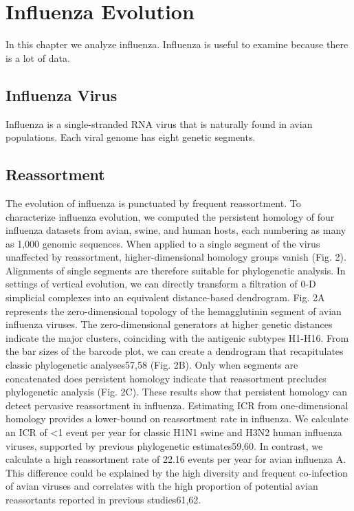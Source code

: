\chapter{Influenza Evolution}
\label{ch:influenza}

In this chapter we analyze influenza.
Influenza is useful to examine because there is a lot of data.

\section{Influenza Virus}
\label{sec:flu_introduction}

Influenza is a single-stranded RNA virus that is naturally found in avian populations.
Each viral genome has eight genetic segments.

\section{Reassortment}
\label{sec:flu_reassortment}

The evolution of influenza is punctuated by frequent reassortment.
To characterize influenza evolution, we computed the persistent homology of four influenza datasets from avian, swine, and human hosts, each numbering as many as 1,000 genomic sequences.
When applied to a single segment of the virus unaffected by reassortment, higher-dimensional homology groups vanish (Fig. 2).
Alignments of single segments are therefore suitable for phylogenetic analysis.
In settings of vertical evolution, we can directly transform a filtration of 0-D simplicial complexes into an equivalent distance-based dendrogram.
 Fig. 2A represents the zero-dimensional topology of the hemagglutinin segment of avian influenza viruses. 
 The zero-dimensional generators at higher genetic distances indicate the major clusters, coinciding with the antigenic subtypes H1-H16.
 From the bar sizes of the barcode plot, we can create a dendrogram that recapitulates classic phylogenetic analyses57,58 (Fig. 2B).
 Only when segments are concatenated does persistent homology indicate that reassortment precludes phylogenetic analysis (Fig. 2C).
 These results show that persistent homology can detect pervasive reassortment in influenza.
 Estimating ICR from one-dimensional homology provides a lower-bound on reassortment rate in influenza.
 We calculate an ICR of <1 event per year for classic H1N1 swine and H3N2 human influenza viruses, supported by previous phylogenetic estimates59,60.
 In contrast, we calculate a high reassortment rate of 22.16 events per year for avian influenza A.
This difference could be explained by the high diversity and frequent co-infection of avian viruses and correlates with the high proportion of potential avian reassortants reported in previous studies61,62.

